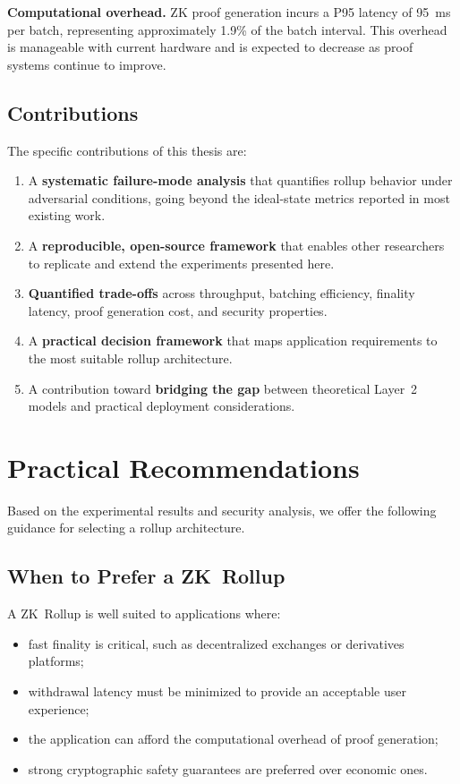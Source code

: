 \documentclass[
]{elteikthesis}[2024/04/26]
\begin{document}
\textbf{Computational overhead.}
ZK proof generation incurs a P95 latency of 95~ms per batch, representing approximately 1.9\% of the batch interval. This overhead is manageable with current hardware and is expected to decrease as proof systems continue to improve.

\subsection{Contributions}

The specific contributions of this thesis are:

\begin{enumerate}
    \item A \textbf{systematic failure-mode analysis} that quantifies rollup behavior under adversarial conditions, going beyond the ideal-state metrics reported in most existing work.
    
    \item A \textbf{reproducible, open-source framework} that enables other researchers to replicate and extend the experiments presented here.
    
    \item \textbf{Quantified trade-offs} across throughput, batching efficiency, finality latency, proof generation cost, and security properties.
    
    \item A \textbf{practical decision framework} that maps application requirements to the most suitable rollup architecture.
    
    \item A contribution toward \textbf{bridging the gap} between theoretical Layer~2 models and practical deployment considerations.
\end{enumerate}

\section{Practical Recommendations}

Based on the experimental results and security analysis, we offer the following guidance for selecting a rollup architecture.

\subsection{When to Prefer a ZK~Rollup}

A ZK~Rollup is well suited to applications where:
\begin{itemize}
    \item fast finality is critical, such as decentralized exchanges or derivatives platforms;
    \item withdrawal latency must be minimized to provide an acceptable user experience;
    \item the application can afford the computational overhead of proof generation;
    \item strong cryptographic safety guarantees are preferred over economic ones.
\end{itemize}
\end{document}
